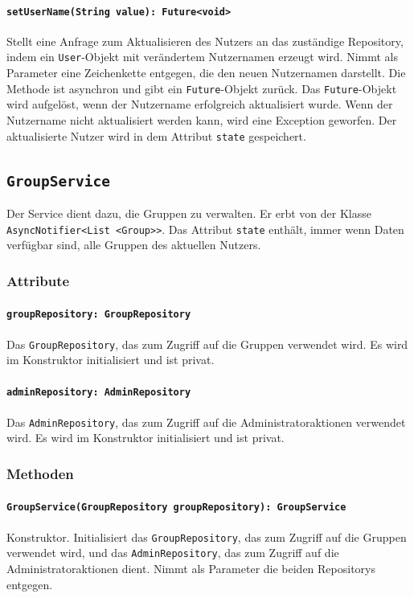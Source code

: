 \documentclass{entwurfsheft}
\begin{document}
\paragraph{\texttt{setUserName(String value): Future<void>}}
Stellt eine Anfrage zum Aktualisieren des Nutzers an das zuständige Repository, indem ein \texttt{User}-Objekt mit verändertem Nutzernamen erzeugt wird. Nimmt als Parameter eine Zeichenkette entgegen, die den neuen Nutzernamen darstellt. Die Methode ist asynchron und gibt ein \texttt{Future}-Objekt zurück. Das \texttt{Future}-Objekt wird aufgelöst, wenn der Nutzername erfolgreich aktualisiert wurde. Wenn der Nutzername nicht aktualisiert werden kann, wird eine Exception geworfen. Der aktualisierte Nutzer wird in dem Attribut \texttt{state} gespeichert.

\newpage
\subsection{\texttt{GroupService}}\label{sec:GroupService}
Der Service dient dazu, die Gruppen zu verwalten. Er erbt von der Klasse \texttt{AsyncNotifier<List <Group>>}. Das Attribut \texttt{state} enthält, immer wenn Daten verfügbar sind, alle Gruppen des aktuellen Nutzers.
\subsubsection*{Attribute}
\paragraph{\texttt{groupRepository: GroupRepository}}
Das \texttt{GroupRepository}, das zum Zugriff auf die Gruppen verwendet wird. Es wird im Konstruktor initialisiert und ist privat.
\paragraph{\texttt{adminRepository: AdminRepository}}
Das \texttt{AdminRepository}, das zum Zugriff auf die Administratoraktionen verwendet wird. Es wird im Konstruktor initialisiert und ist privat.
\subsubsection*{Methoden}
\paragraph{\texttt{GroupService(GroupRepository groupRepository): GroupService}}
Konstruktor. Initialisiert das \texttt{GroupRepository}, das zum Zugriff auf die Gruppen verwendet wird, und das \texttt{AdminRe\-pository}, das zum Zugriff auf die Administratoraktionen dient. Nimmt als Parameter die beiden Repositorys entgegen.
\end{document}

